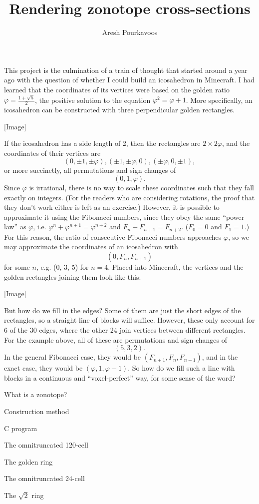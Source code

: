 \documentclass{article}
\begin{document}
\title{Rendering zonotope cross-sections}
\author{Aresh Pourkavoos}
\maketitle

This project is the culmination of a train of thought
that started around a year ago
with the question of whether I could build an icosahedron in Minecraft.
I had learned that the coordinates of its vertices
were based on the golden ratio $\varphi = \frac{1+\sqrt{5}}{2}$,
the positive solution to the equation $\varphi^2 = \varphi+1$.
More specifically,
an icosahedron can be constructed with three perpendicular golden rectangles.

[Image]

If the icosahedron has a side length of 2,
then the rectangles are $2 \times 2\varphi$,
and the coordinates of their vertices are
\[
(0, \pm 1, \pm \varphi),
(\pm 1, \pm \varphi, 0),
(\pm \varphi, 0, \pm 1),
\]
or more succinctly,
all permutations and sign changes of
\[(0, 1, \varphi).\]
Since $\varphi$ is irrational,
there is no way to scale these coordinates
such that they fall exactly on integers.
(For the readers who are considering rotations,
the proof that they don't work either is left as an exercise.)
However, it is possible to approximate it using the Fibonacci numbers,
since they obey the same ``power law'' as $\varphi$,
i.e. $\varphi^{n}+\varphi^{n+1}=\varphi^{n+2}$ and $F_n+F_{n+1}=F_{n+2}$.
($F_0=0$ and $F_1=1$.)
For this reason, the ratio of consecutive Fibonacci numbers approaches $\varphi$,
so we may approximate the coordinates of an icosahedron with
\[(0, F_n, F_{n+1})\]
for some $n$,
e.g. (0, 3, 5) for $n=4$.
Placed into Minecraft, the vertices and the golden rectangles joining them look like this:

[Image]

But how do we fill in the edges?
Some of them are just the short edges of the rectangles,
so a straight line of blocks will suffice.
However, these only account for 6 of the 30 edges,
where the other 24 join vertices between different rectangles.
For the example above,
all of these are permutations and sign changes of
\[(5, 3, 2).\]
In the general Fibonacci case,
they would be $(F_{n+1}, F_n, F_{n-1})$,
and in the exact case,
they would be $(\varphi, 1, \varphi-1)$.
So how do we fill such a line with blocks
in a continuous and ``voxel-perfect'' way,
for some sense of the word?

What is a zonotope?

Construction method

C program

The omnitruncated 120-cell

The golden ring

The omnitruncated 24-cell

The $\sqrt{2}$ ring
\end{document}
